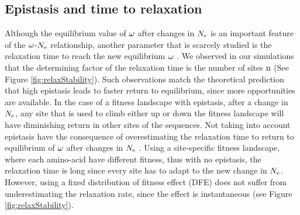 \documentclass{article}
\begin{document}
\subsection*{Epistasis and time to relaxation}
Although the equilibrium value of $\omega$ after changes in $N_{\mathrm{e}}$ is an important feature of the $\omega$-$N_{\mathrm{e}}$ relationship, another parameter that is scarcely studied is the relaxation time to reach the new equilibrium $\omega$ \cite{Jones2016}.
We observed in our simulations that the determining factor of the relaxation time is the number of sites $\text{n}$ (See Figure \ref{fig:relaxStability}).
Such observations match the theoretical prediction that high epistasis leads to faster return to equilibrium, since more opportunities are available.
In the case of a fitness landscape with epistasis, after a change in $N_{\mathrm{e}}$, any site that is used to climb either up or down the fitness landscape will have diminishing return in other sites of the sequences.
Not taking into account epistasis have the consequence of overestimating the relaxation time to return to equilibrium of $\omega$ after changes in $N_{\mathrm{e}}$ .
Using a site-specific fitness landscape, where each amino-acid have different fitness, thus with no epistasis, the relaxation time is long since every site has to adapt to the new change in $N_{\mathrm{e}}$.
However, using a fixed distribution of fitness effect (DFE) does not suffer from underestimating the relaxation rate, since the effect is instantaneous (see Figure \ref{fig:relaxStability}).
\end{document}
